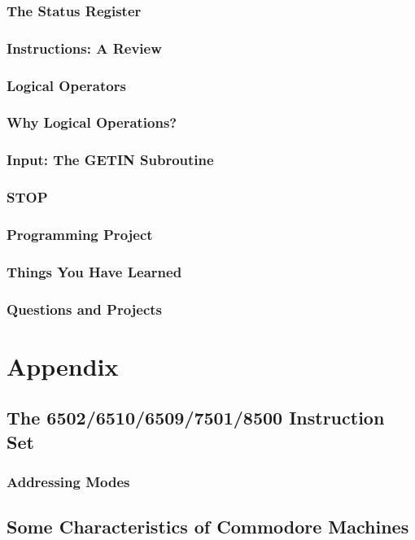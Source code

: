 \documentclass[11pt,a4paper,titlepage]{memoir}
\begin{document}
\section{The Status Register} 
\blindtext
\section{Instructions: A Review} 
\blindtext
\section{Logical Operators} 
\blindtext
\section{Why Logical Operations?} 
\blindtext
\section{Input: The GETIN Subroutine} 
\blindtext
\section{STOP} 
\blindtext
\section{Programming Project} 
\blindtext
\section{Things You Have Learned} 
\blindtext
\section{Questions and Projects} 
\blindtext
\appendix
\part{Appendix}
\chapter{The 6502/6510/6509/7501/8500 Instruction Set}
\section{Addressing Modes}
\blindtext
\chapter{Some Characteristics of Commodore Machines}
\blindtext
\end{document}
